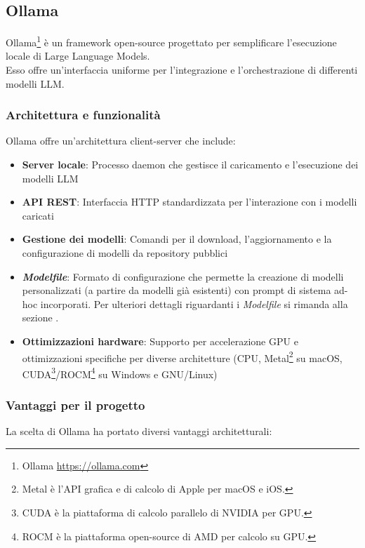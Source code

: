 \documentclass[12pt]{report}
\begin{document}
\subsection{Ollama}
\label{subsec:ollama}

Ollama\footnote{Ollama \url{https://ollama.com}} è un framework open-source progettato per semplificare l'esecuzione locale di Large Language Models.\\
Esso offre un'interfaccia uniforme per l'integrazione e l'orchestrazione di differenti modelli LLM.

\subsubsection{Architettura e funzionalità}
Ollama offre un'architettura client-server che include:

\begin{itemize}
    \item \textbf{Server locale}: Processo daemon che gestisce il caricamento e l'esecuzione dei modelli LLM
    \item \textbf{API REST}: Interfaccia HTTP standardizzata per l'interazione con i modelli caricati
    \item \textbf{Gestione dei modelli}: Comandi per il download, l'aggiornamento e la configurazione di modelli da repository pubblici
    \item \textit{\textbf{Modelfile}}: Formato di configurazione che permette la creazione di modelli personalizzati (a partire da modelli già esistenti) con prompt di sistema ad-hoc incorporati. Per ulteriori dettagli riguardanti i \textit{Modelfile} si rimanda alla sezione .
    \item \textbf{Ottimizzazioni hardware}: Supporto per accelerazione GPU e ottimizzazioni specifiche per diverse architetture (CPU, Metal\footnote{Metal è l'API grafica e di calcolo di Apple per macOS e iOS.} su macOS, CUDA\footnote{CUDA è la piattaforma di calcolo parallelo di NVIDIA per GPU.}/ROCM\footnote{ROCM è la piattaforma open-source di AMD per calcolo su GPU.} su Windows e GNU/Linux)
\end{itemize}

\subsubsection{Vantaggi per il progetto}
La scelta di Ollama ha portato diversi vantaggi architetturali:
\end{document}
